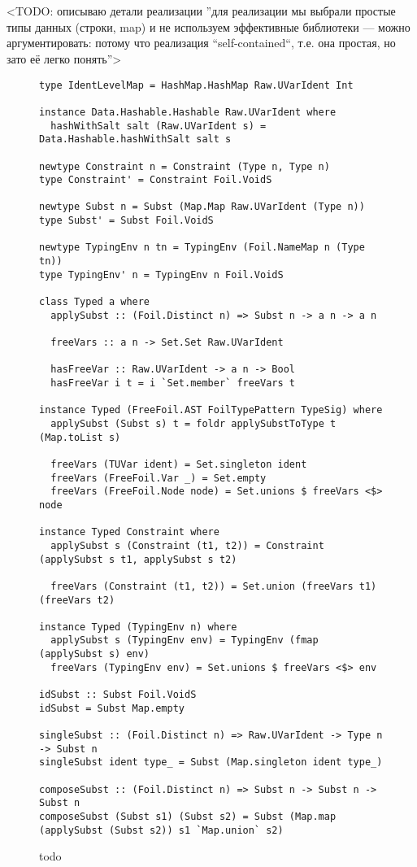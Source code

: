 \section{}

<TODO: описываю детали реализации ”для реализации мы выбрали простые типы данных (строки, map) и не используем эффективные библиотеки — можно аргументировать: потому что реализация “self-contained“, т.е. она простая, но зато её легко понять”>

\begin{figure}[H]
  \begin{verbatim}
type IdentLevelMap = HashMap.HashMap Raw.UVarIdent Int

instance Data.Hashable.Hashable Raw.UVarIdent where
  hashWithSalt salt (Raw.UVarIdent s) = Data.Hashable.hashWithSalt salt s

newtype Constraint n = Constraint (Type n, Type n)
type Constraint' = Constraint Foil.VoidS

newtype Subst n = Subst (Map.Map Raw.UVarIdent (Type n))
type Subst' = Subst Foil.VoidS

newtype TypingEnv n tn = TypingEnv (Foil.NameMap n (Type tn))
type TypingEnv' n = TypingEnv n Foil.VoidS

class Typed a where
  applySubst :: (Foil.Distinct n) => Subst n -> a n -> a n

  freeVars :: a n -> Set.Set Raw.UVarIdent

  hasFreeVar :: Raw.UVarIdent -> a n -> Bool
  hasFreeVar i t = i `Set.member` freeVars t

instance Typed (FreeFoil.AST FoilTypePattern TypeSig) where
  applySubst (Subst s) t = foldr applySubstToType t (Map.toList s)

  freeVars (TUVar ident) = Set.singleton ident
  freeVars (FreeFoil.Var _) = Set.empty
  freeVars (FreeFoil.Node node) = Set.unions $ freeVars <$> node

instance Typed Constraint where
  applySubst s (Constraint (t1, t2)) = Constraint (applySubst s t1, applySubst s t2)

  freeVars (Constraint (t1, t2)) = Set.union (freeVars t1) (freeVars t2)

instance Typed (TypingEnv n) where
  applySubst s (TypingEnv env) = TypingEnv (fmap (applySubst s) env)
  freeVars (TypingEnv env) = Set.unions $ freeVars <$> env

idSubst :: Subst Foil.VoidS
idSubst = Subst Map.empty

singleSubst :: (Foil.Distinct n) => Raw.UVarIdent -> Type n -> Subst n
singleSubst ident type_ = Subst (Map.singleton ident type_)

composeSubst :: (Foil.Distinct n) => Subst n -> Subst n -> Subst n
composeSubst (Subst s1) (Subst s2) = Subst (Map.map (applySubst (Subst s2)) s1 `Map.union` s2)
  \end{verbatim}
  \caption{todo}
\end{figure}

